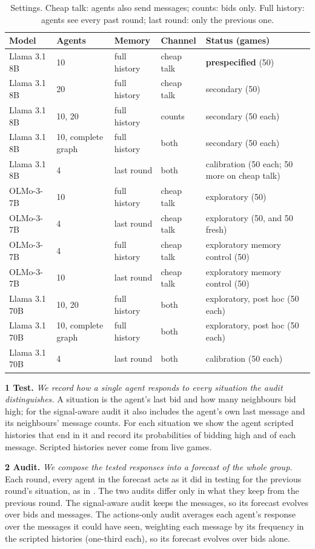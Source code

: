 \documentclass[11pt,letterpaper]{article}
\begin{document}
\begin{table}[H]
  \centering\small
  \caption{Settings. Cheap talk: agents also send messages; counts: bids only. Full history: agents see every past round; last round: only the previous one.}
  \label{tab:settings}
  \begin{tabular}{@{}lllll@{}}
    \toprule
    Model & Agents & Memory & Channel & Status (games) \\
    \midrule
    Llama 3.1 8B & 10 & full history & cheap talk & \textbf{prespecified} (50) \\
    Llama 3.1 8B & 20 & full history & cheap talk & secondary (50) \\
    Llama 3.1 8B & 10, 20 & full history & counts & secondary (50 each) \\
    Llama 3.1 8B & 10, complete graph & full history & both & secondary (50 each) \\
    Llama 3.1 8B & 4 & last round & both & calibration (50 each; 50 more on cheap talk) \\
    OLMo-3-7B & 10 & full history & cheap talk & exploratory (50) \\
    OLMo-3-7B & 4 & last round & cheap talk & exploratory (50, and 50 fresh) \\
    OLMo-3-7B & 4 & full history & cheap talk & exploratory memory control (50) \\
    OLMo-3-7B & 10 & last round & cheap talk & exploratory memory control (50) \\
    Llama 3.1 70B & 10, 20 & full history & both & exploratory, post hoc (50 each) \\
    Llama 3.1 70B & 10, complete graph & full history & both & exploratory, post hoc (50 each) \\
    Llama 3.1 70B & 4 & last round & both & calibration (50 each) \\
    \bottomrule
  \end{tabular}
\end{table}

\textbf{1 Test.}
\emph{We record how a single agent responds to every situation the audit distinguishes.}
A situation is the agent's last bid and how many neighbours bid high; for the signal-aware audit it also includes the agent's own last message and its neighbours' message counts.
For each situation we show the agent scripted histories that end in it and record its probabilities of bidding high and of each message.
Scripted histories never come from live games.

\textbf{2 Audit.}
\emph{We compose the tested responses into a forecast of the whole group.}
Each round, every agent in the forecast acts as it did in testing for the previous round's situation, as in \citet{flint2026}.
The two audits differ only in what they keep from the previous round.
The signal-aware audit keeps the messages, so its forecast evolves over bids and messages.
The actions-only audit averages each agent's response over the messages it could have seen, weighting each message by its frequency in the scripted histories (one-third each), so its forecast evolves over bids alone.
\end{document}
